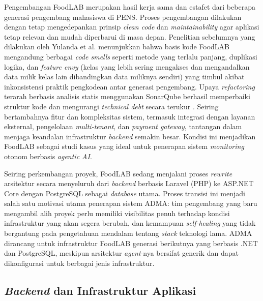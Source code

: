 Pengembangan FoodLAB merupakan hasil kerja sama dan estafet dari beberapa generasi pengembang mahasiswa di PENS. Proses pengembangan dilakukan dengan tetap mengedepankan prinsip \textit{clean code} dan \textit{maintainability} agar aplikasi tetap relevan dan mudah diperbarui di masa depan. Penelitian sebelumnya yang dilakukan oleh Yulanda et al. \cite{yulanda2025refactoring} menunjukkan bahwa basis kode FoodLAB mengandung berbagai \textit{code smells} seperti metode yang terlalu panjang, duplikasi logika, dan \textit{feature envy} (kelas yang lebih sering mengakses dan mengandalkan data milik kelas lain dibandingkan data miliknya sendiri) yang timbul akibat inkonsistensi praktik pengkodean antar generasi pengembang. Upaya \textit{refactoring} terarah berbasis analisis statis menggunakan SonarQube berhasil memperbaiki struktur kode dan mengurangi \textit{technical debt} secara terukur \cite{yulanda2025refactoring}. Seiring bertambahnya fitur dan kompleksitas sistem, termasuk integrasi dengan layanan eksternal, pengelolaan \textit{multi-tenant}, dan \textit{payment gateway}, tantangan dalam menjaga keandalan infrastruktur \textit{backend} semakin besar. Kondisi ini menjadikan FoodLAB sebagai studi kasus yang ideal untuk penerapan sistem \textit{monitoring} otonom berbasis \textit{agentic AI}.

Seiring perkembangan proyek, FoodLAB sedang menjalani proses \textit{rewrite} arsitektur secara menyeluruh dari \textit{backend} berbasis Laravel (PHP) ke ASP.NET Core dengan PostgreSQL sebagai \textit{database} utama. Proses transisi ini menjadi salah satu motivasi utama penerapan sistem ADMA: tim pengembang yang baru mengambil alih proyek perlu memiliki visibilitas penuh terhadap kondisi infrastruktur yang akan segera berubah, dan kemampuan \textit{self-healing} yang tidak bergantung pada pengetahuan mendalam tentang \textit{stack} teknologi lama. ADMA dirancang untuk infrastruktur FoodLAB generasi berikutnya yang berbasis .NET dan PostgreSQL, meskipun arsitektur \textit{agent}-nya bersifat generik dan dapat dikonfigurasi untuk berbagai jenis infrastruktur.

\subsection{\textit{Backend} dan Infrastruktur Aplikasi}

